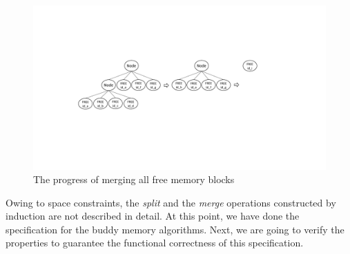 \begin{figure}
	\centering
	\includegraphics[width=1\textwidth]{fig2.pdf}
	\caption{The progress of merging all free memory blocks}
	\label{fig2}
\end{figure}

Owing to space constraints, the \emph{split} and the \emph{merge} operations constructed by induction are not described in detail. At this point, we have done the specification for the buddy memory algorithms. Next, we are going to verify the properties to guarantee the functional correctness of this specification.
